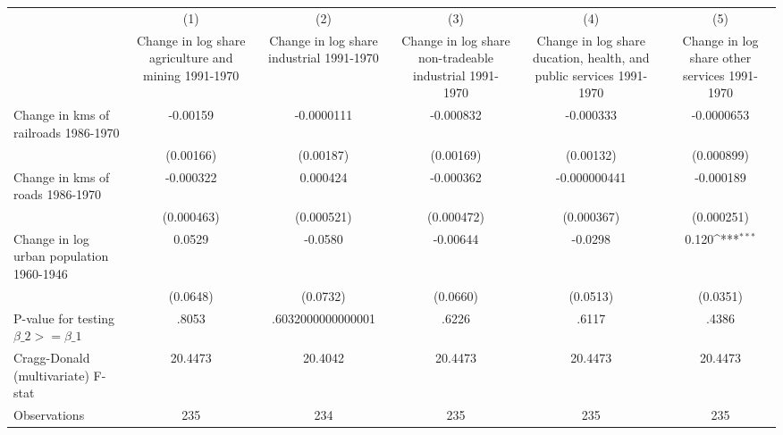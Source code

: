 {
\def\sym#1{\ifmmode^{#1}\else\(^{#1}\)\fi}
\begin{tabular}{l*{5}{c}}
\hline\hline
                &\multicolumn{1}{c}{(1)}&\multicolumn{1}{c}{(2)}&\multicolumn{1}{c}{(3)}&\multicolumn{1}{c}{(4)}&\multicolumn{1}{c}{(5)}\\
                &\multicolumn{1}{c}{Change in log share agriculture and mining 1991-1970}&\multicolumn{1}{c}{Change in log share industrial 1991-1970}&\multicolumn{1}{c}{Change in log share non-tradeable industrial 1991-1970}&\multicolumn{1}{c}{Change in log share ducation, health, and public services 1991-1970}&\multicolumn{1}{c}{Change in log share other services 1991-1970}\\
\hline
Change in kms of railroads 1986-1970& -0.00159         &-0.0000111         &-0.000832         &-0.000333         &-0.0000653         \\
                &(0.00166)         &(0.00187)         &(0.00169)         &(0.00132)         &(0.000899)         \\
[1em]
Change in kms of roads 1986-1970&-0.000322         & 0.000424         &-0.000362         &-0.000000441         &-0.000189         \\
                &(0.000463)         &(0.000521)         &(0.000472)         &(0.000367)         &(0.000251)         \\
[1em]
Change in log urban population 1960-1946&   0.0529         &  -0.0580         & -0.00644         &  -0.0298         &    0.120\sym{***}\\
                & (0.0648)         & (0.0732)         & (0.0660)         & (0.0513)         & (0.0351)         \\
\hline
P-value for testing $\beta\_{2} >= \beta\_{1}$&    .8053         &.6032000000000001         &    .6226         &    .6117         &    .4386         \\
Cragg-Donald (multivariate) F-stat&  20.4473         &  20.4042         &  20.4473         &  20.4473         &  20.4473         \\
Observations    &      235         &      234         &      235         &      235         &      235         \\
\hline\hline
\end{tabular}
}
